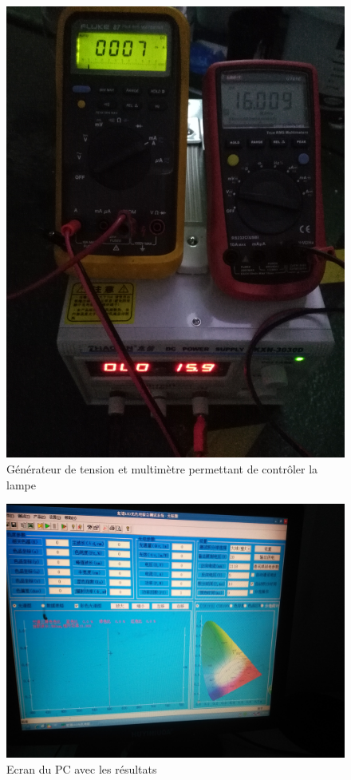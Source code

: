 \documentclass[a4paper, 12pt, sffamily]{report}
\begin{document}
\begin{figure}[H]
\centering
\includegraphics[scale=0.08]{figures/photos/tests_worklamp/sphere/mesure_1.jpg}
\caption{Générateur de tension et multimètre permettant de contrôler la lampe}
\label{fig:multimeters}
\end{figure}

\begin{figure}[H]
\centering
\includegraphics[scale=0.08]{figures/photos/tests_worklamp/sphere/ecran_PC.jpg}
\caption{Ecran du PC avec les résultats} 
\label{fig:PC_screen}
\end{figure}

\listoffigures



\end{document}
